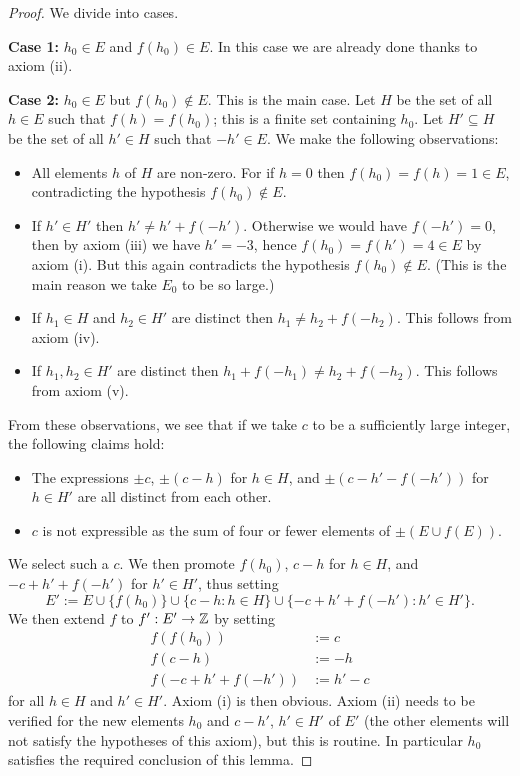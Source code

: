 \begin{proof}  We divide into cases.

  {\bf Case 1:} $h_0 \in E$ and $f(h_0) \in E$.  In this case we are already done thanks to axiom (ii).

  {\bf Case 2:} $h_0 \in E$ but $f(h_0) \not \in E$.  This is the main case.  Let $H$ be the set of all $h \in E$ such that $f(h) = f(h_0)$; this is a finite set containing $h_0$.  Let $H' \subseteq H$ be the set of all $h' \in H$ such that $-h' \in E$.  We make the following observations:
  \begin{itemize}
  \item[(a)] All elements $h$ of $H$ are non-zero.  For if $h=0$ then $f(h_0)=f(h)=1 \in E$, contradicting the hypothesis $f(h_0) \not \in E$.
  \item[(b)]  If $h' \in H'$ then $h' \neq h'+f(-h')$.  Otherwise we would have $f(-h')=0$, then by axiom (iii) we have $h' = -3$, hence $f(h_0) = f(h') = 4 \in E$ by axiom (i).  But this again contradicts the hypothesis $f(h_0) \not \in E$. (This is the main reason we take $E_0$ to be so large.)
  \item[(c)]  If $h_1 \in H$ and $h_2 \in H'$ are distinct then $h_1 \neq h_2+f(-h_2)$.  This follows from axiom (iv).
  \item[(d)]  If $h_1, h_2\in H'$ are distinct then $h_1+f(-h_1) \neq h_2+f(-h_2)$. This follows from axiom (v).
  \end{itemize}

  From these observations, we see that if we take $c$ to be a sufficiently large integer, the following claims hold:
  \begin{itemize}
  \item[1.]  The expressions $\pm c$, $\pm(c - h)$ for $h \in H$, and $\pm(c-h'-f(-h'))$ for $h \in H'$ are all distinct from each other.
  \item[2.]  $c$ is not expressible as the sum of four or fewer elements of $\pm (E \cup f(E))$.
  \end{itemize}

  We select such a $c$.  We then promote $f(h_0)$, $c - h$ for $h \in H$, and $-c+h'+f(-h')$ for $h' \in H'$, thus setting
  $$ E' := E \cup \{f(h_0)\} \cup \{ c-h: h \in H\} \cup \{ -c+h'+f(-h'): h' \in H'\}.$$
We then extend $f$ to $f': E' \to \mathbb{Z}$ by setting
\begin{align*}
  f(f(h_0)) &:= c \\
  f(c-h) &:= -h \\
  f(-c+h'+f(-h')) &:= h' - c
\end{align*}
for all $h \in H$ and $h' \in H'$.  Axiom (i) is then obvious.  Axiom (ii) needs to be verified for the new elements $h_0$ and $c-h'$, $h' \in H'$ of $E'$ (the other elements will not satisfy the hypotheses of this axiom), but this is routine.  In particular $h_0$ satisfies the required conclusion of this lemma.


\end{proof}
